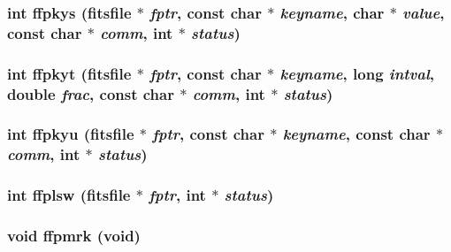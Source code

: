\subsubsection{\setlength{\rightskip}{0pt plus 5cm}int ffpkys (\bf{fitsfile} $\ast$ {\em fptr}, const char $\ast$ {\em keyname}, char $\ast$ {\em value}, const char $\ast$ {\em comm}, int $\ast$ {\em status})}\label{src_2fitsio_8h_3d860f3d7031a0ba399a769045eda878}


\subsubsection{\setlength{\rightskip}{0pt plus 5cm}int ffpkyt (\bf{fitsfile} $\ast$ {\em fptr}, const char $\ast$ {\em keyname}, long {\em intval}, double {\em frac}, const char $\ast$ {\em comm}, int $\ast$ {\em status})}\label{src_2fitsio_8h_002c4753bb2fe0d01f18b7d920eaa8e6}


\subsubsection{\setlength{\rightskip}{0pt plus 5cm}int ffpkyu (\bf{fitsfile} $\ast$ {\em fptr}, const char $\ast$ {\em keyname}, const char $\ast$ {\em comm}, int $\ast$ {\em status})}\label{src_2fitsio_8h_f93e8090a4a84d3fdb98b798e9a454a8}


\subsubsection{\setlength{\rightskip}{0pt plus 5cm}int ffplsw (\bf{fitsfile} $\ast$ {\em fptr}, int $\ast$ {\em status})}\label{src_2fitsio_8h_961af8c215ce5bb2d2d74ba7d5b02591}


\subsubsection{\setlength{\rightskip}{0pt plus 5cm}void ffpmrk (void)}\label{src_2fitsio_8h_b9700796363d20498ceec03ad6c3b976}



